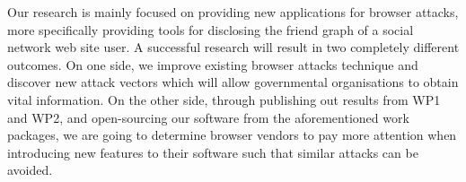 \documentclass[a4paper,11pt]{article}
\begin{document}
Our research is mainly focused on providing new applications for browser attacks, more specifically providing tools for disclosing the friend graph of a social network web site user. A successful research will result in two completely different outcomes. On one side, we improve existing browser attacks technique and discover new attack vectors which will allow governmental organisations to obtain vital information. On the other side, through publishing out results from WP1 and WP2, and open-sourcing our software from the aforementioned work packages, we are going to determine browser vendors to pay more attention when introducing new features to their software such that similar attacks can be avoided. 
\end{document}
